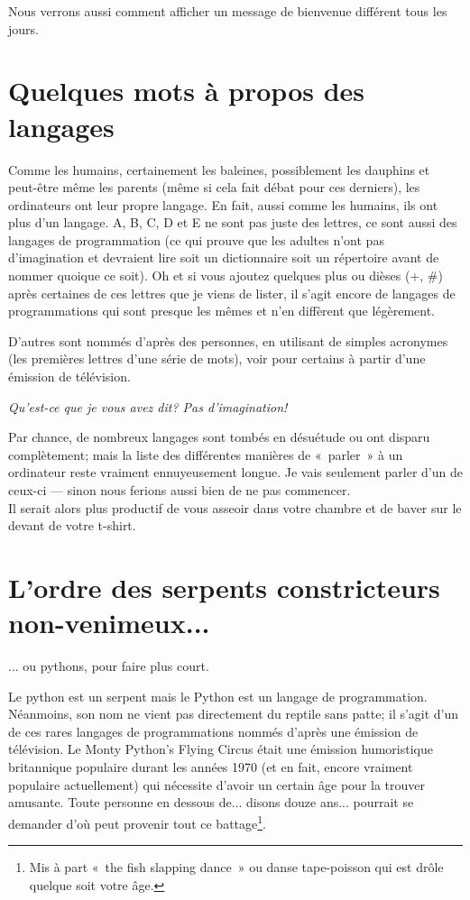 Nous verrons aussi comment afficher un message de bienvenue différent tous les jours.

\section{Quelques mots à propos des langages}
Comme les humains, certainement les baleines, possiblement les dauphins et peut-être même les parents (même si cela fait débat pour ces derniers), les ordinateurs ont leur propre langage. En fait, aussi comme les humains, ils ont plus d'un langage. A, B, C, D et E ne sont pas juste des lettres, ce sont aussi des langages de programmation (ce qui prouve que les adultes n'ont pas d'imagination et devraient lire soit un dictionnaire soit un répertoire avant de nommer quoique ce soit). Oh et si vous ajoutez quelques plus ou dièses (+, \#) après certaines de ces lettres que je viens de lister, il s'agit encore de langages de programmations qui sont presque les mêmes et n'en diffèrent que légèrement.

D'autres sont nommés d'après des personnes, en utilisant de simples acronymes (les premières lettres d'une série de mots), voir pour certains à partir d'une émission de télévision. 

\bigskip
\emph{Qu'est-ce que je vous avez dit? Pas d'imagination!}

\bigskip
Par chance, de nombreux langages sont tombés en désuétude ou ont disparu complètement; mais la liste des différentes manières de « parler » à un ordinateur reste vraiment ennuyeusement longue. Je vais seulement parler d'un de ceux-ci --- sinon nous ferions aussi bien de ne pas commencer.\\


Il serait alors plus productif de vous asseoir dans votre chambre et de baver sur le devant de votre t-shirt.

\section{L'ordre des serpents constricteurs non-venimeux...}
... ou pythons, pour faire plus court.

\bigskip
Le python est un serpent mais le Python est un langage de programmation. Néanmoins, son nom ne vient pas directement du reptile sans patte; il s'agit d'un de ces rares langages de programmations nommés d'après une émission de télévision. Le Monty Python's Flying Circus était une émission humoristique britannique populaire durant les années 1970 (et en fait, encore vraiment populaire actuellement) qui nécessite d'avoir un certain âge pour la trouver amusante. Toute personne en dessous de... disons douze ans... pourrait se demander d'où peut provenir tout ce battage\footnote{Mis à part « the fish slapping dance » ou danse tape-poisson qui est drôle quelque soit votre âge.}.

